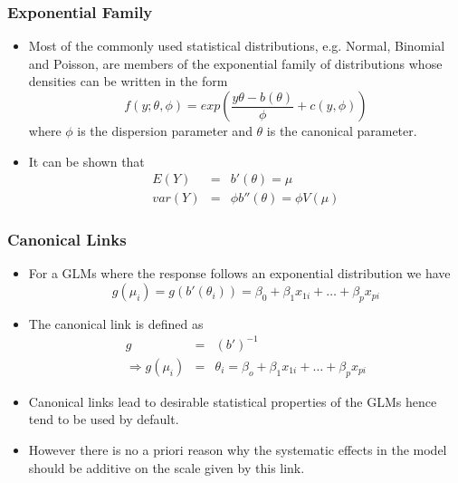 \documentclass[10pt,xcolor={svgnames},t]{beamer}
\begin{document}
\begin{frame}
	\frametitle{Exponential Family}
	
	\begin{itemize}
		\item Most of the commonly used statistical distributions, e.g. Normal, Binomial and Poisson, are members of the exponential family of distributions whose densities can be written in the form
		\[ f(y; \theta, \phi )=exp \left ( \frac{y\theta-b(\theta)}{\phi}+c(y,\phi)  \right)
		\]
		where $\phi$ is the dispersion parameter and $\theta$ is the canonical parameter.
		\bigskip
		\item It can be shown that
		\begin{eqnarray*}
			E(Y) &=& b'(\theta) = \mu \\
			var(Y)&=&\phi b''(\theta)=\phi V(\mu)
		\end{eqnarray*}
	\end{itemize}
	
	
\end{frame}
%
%
\begin{frame}
	\frametitle{Canonical Links}
	
	\begin{itemize}
		\item For a GLMs where the response follows an exponential distribution we have
		\[ g(\mu_i )=g(b'(\theta_i ))=\beta_0 +\beta_1 x_{1i} + \ldots + \beta_p x_{pi}
		\]

		\item The canonical link is defined as 
		\begin{eqnarray*}
			g&=&(b')^{-1} \\
			\Rightarrow	g(\mu_i )&=&\theta_i = \beta_o + \beta_1 x_{1i}+ \ldots + \beta_p x_{pi}
		\end{eqnarray*}

		\item Canonical links lead to desirable statistical properties of the GLMs hence tend to be used by default.
				\bigskip
		\item However there is no a priori reason why the systematic effects in the model should be additive on the scale given by this link.
	\end{itemize}
	
	
\end{frame}
\end{document}
